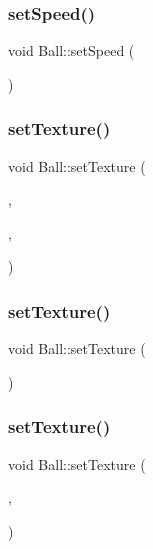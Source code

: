 \subsubsection{\texorpdfstring{setSpeed()}{setSpeed()}}
{\footnotesize\ttfamily void Ball\+::set\+Speed (\begin{DoxyParamCaption}\item[{const sf\+::\+Vector2f \&}]{ }\end{DoxyParamCaption})}

\mbox{\label{class_ball_a9ac324bd0e233a1baf7ccb9eee5d05ca}} 
\subsubsection{\texorpdfstring{setTexture()}{setTexture()}\hspace{0.1cm}{\footnotesize\ttfamily [1/3]}}
{\footnotesize\ttfamily void Ball\+::set\+Texture (\begin{DoxyParamCaption}\item[{\mbox{\hyperlink{class_game_engine}{Game\+Engine}} $\ast$}]{,  }\item[{std\+::string}]{,  }\item[{sf\+::\+Int\+Rect}]{ }\end{DoxyParamCaption})}

\mbox{\label{class_ball_a4f750fa26a759145e3b04bba05d87711}} 
\subsubsection{\texorpdfstring{setTexture()}{setTexture()}\hspace{0.1cm}{\footnotesize\ttfamily [2/3]}}
{\footnotesize\ttfamily void Ball\+::set\+Texture (\begin{DoxyParamCaption}\item[{const std\+::shared\+\_\+ptr$<$ sf\+::\+Texture $>$}]{ }\end{DoxyParamCaption})}

\mbox{\label{class_ball_af15cbcd2773587b98db326fbc994b7a2}} 
\subsubsection{\texorpdfstring{setTexture()}{setTexture()}\hspace{0.1cm}{\footnotesize\ttfamily [3/3]}}
{\footnotesize\ttfamily void Ball\+::set\+Texture (\begin{DoxyParamCaption}\item[{const std\+::shared\+\_\+ptr$<$ sf\+::\+Texture $>$}]{,  }\item[{sf\+::\+Int\+Rect}]{ }\end{DoxyParamCaption})}


